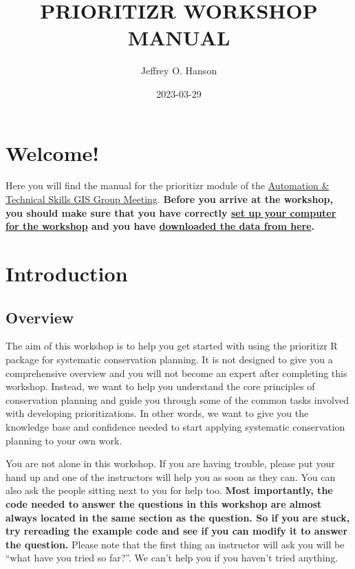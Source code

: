 \documentclass[12pt,]{book}
\title{PRIORITIZR WORKSHOP MANUAL}
\author{Jeffrey O. Hanson}
\date{2023-03-29}
\begin{document}
\maketitle

{
\hypersetup{linkcolor=}
\setcounter{tocdepth}{0}
\tableofcontents
}
\hypertarget{welcome}{%
\chapter{Welcome!}\label{welcome}}

Here you will find the manual for the prioritizr module of the \href{https://prioritizr.github.io/NCC-workshop/}{Automation \& Technical Skills GIS Group Meeting}. \textbf{Before you arrive at the workshop, you should make sure that you have correctly \protect\hyperlink{setup}{set up your computer for the workshop} and you have \href{https://github.com/prioritizr/NCC-workshop/raw/main/data.zip}{downloaded the data from here}.}

\hypertarget{introduction}{%
\chapter{Introduction}\label{introduction}}

\hypertarget{overview}{%
\section{Overview}\label{overview}}

The aim of this workshop is to help you get started with using the prioritizr R package for systematic conservation planning. It is not designed to give you a comprehensive overview and you will not become an expert after completing this workshop. Instead, we want to help you understand the core principles of conservation planning and guide you through some of the common tasks involved with developing prioritizations. In other words, we want to give you the knowledge base and confidence needed to start applying systematic conservation planning to your own work.

You are not alone in this workshop. If you are having trouble, please put your hand up and one of the instructors will help you as soon as they can. You can also ask the people sitting next to you for help too. \textbf{Most importantly, the code needed to answer the questions in this workshop are almost always located in the same section as the question. So if you are stuck, try rereading the example code and see if you can modify it to answer the question.} Please note that the first thing an instructor will ask you will be ``what have you tried so far?''. We can't help you if you haven't tried anything.
\end{document}
